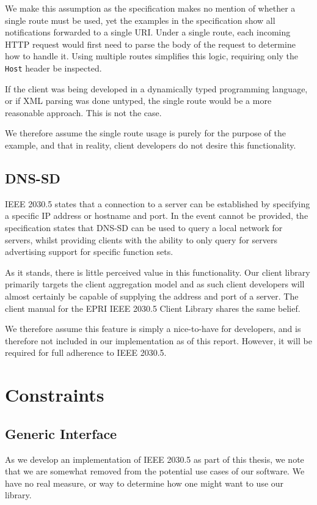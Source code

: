We make this assumption as the specification makes no mention of whether a single route must be used, yet the examples in the specification show all notifications forwarded to a single URI. Under a single route, each incoming HTTP request would first need to parse the body of the request to determine how to handle it. Using multiple routes simplifies this logic, requiring only the \texttt{Host} header be inspected. 

If the client was being developed in a dynamically typed programming language, or if XML parsing was done untyped, the single route would be a more reasonable approach. This is not the case.

We therefore assume the single route usage is purely for the purpose of the example, and that in reality, client developers do not desire this functionality.

\subsection{DNS-SD}
IEEE 2030.5 states that a connection to a server can be established by specifying a specific IP address or hostname and port. In the event cannot be provided, the specification states that DNS-SD can be used to query a local network for servers, whilst providing clients with the ability to only query for servers advertising support for specific function sets. 

As it stands, there is little perceived value in this functionality. Our client library primarily targets the client aggregation model and as such client developers will almost certainly be capable of supplying the address and port of a server.
The client manual for the EPRI IEEE 2030.5 Client Library shares the same belief. \cite{eprimanual}

We therefore assume this feature is simply a nice-to-have for developers, and is therefore not included in our implementation as of this report. However, it will be required for full adherence to IEEE 2030.5.

\section{Constraints}

\subsection{Generic Interface}
As we develop an implementation of IEEE 2030.5 as part of this thesis, we note that we are somewhat removed from the potential use cases of our software. We have no real measure, or way to determine how one might want to use our library. 

